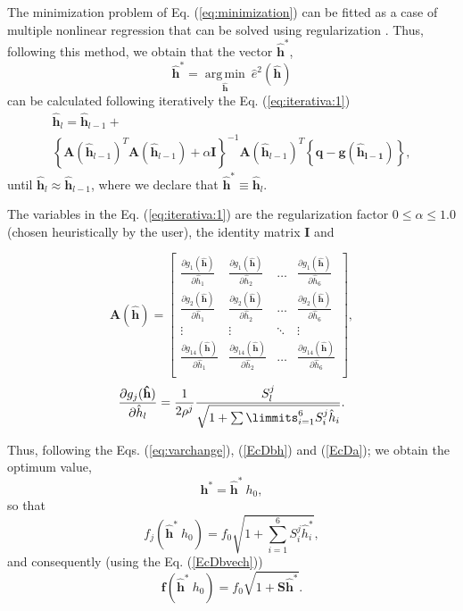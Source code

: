 \documentclass[11pt,twocolumn]{article}
\newcommand{\DERPAR}[4]{\frac{\partial #1_{#3}(\mathbf{\hat{#2}})}{ \partial \hat{#2}_{#4}}}
\begin{document}
The minimization problem of Eq. (\ref{eq:minimization}) can be fitted as a case of multiple nonlinear regression 
that can be solved using regularization 
\citep[pp. 129]{pujaicoriverafernando2020}. 
Thus, following this method, we obtain that the vector $\mathbf{\hat{h}}^{*}$, 
\begin{equation}
\mathbf{\hat{h}}^{*}= \underset{\mathbf{\hat{h}}}{\operatorname {arg\,min}}~\hat{e}^2(\mathbf{\hat{h}})
\end{equation}
can be calculated following iteratively the Eq. (\ref{eq:iterativa:1}) 
\small
\begin{equation}\label{eq:iterativa:1}
\begin{array}{l}
\mathbf{\hat{h}}_{l} = \mathbf{\hat{h}}_{l-1}+\\ 
\left\{\mathbf{A}(\mathbf{\hat{h}}_{l-1})^{T} \mathbf{A}(\mathbf{\hat{h}}_{l-1})+\alpha \mathbf{I}\right\}^{-1}
\mathbf{A}(\mathbf{\hat{h}}_{l-1})^{T} \left\{\mathbf{q}-\mathbf{g}(\mathbf{\hat{h}_{l-1}})\right\},
\end{array}
\end{equation}
\normalsize
until $\mathbf{\hat{h}}_{l} \approx \mathbf{\hat{h}}_{l-1}$,
where we declare that $\mathbf{\hat{h}}^{*} \equiv \mathbf{\hat{h}}_{l}$. 

The variables in the Eq. (\ref{eq:iterativa:1}) are the regularization factor $0 \leq \alpha \leq 1.0$ 
(chosen heuristically  by the user), the identity matrix $\mathbf{I}$ and

\begin{equation}
\mathbf{A}(\mathbf{\hat{h}})=
\left[
\begin{matrix}
\DERPAR{g}{h}{1}{1} & \DERPAR{g}{h}{1}{2} & \hdots & \DERPAR{g}{h}{1}{6} \\ 
\DERPAR{g}{h}{2}{1} & \DERPAR{g}{h}{2}{2} & \hdots & \DERPAR{g}{h}{2}{6} \\
\vdots & \vdots & \ddots & \vdots \\ 
\DERPAR{g}{h}{14}{1} & \DERPAR{g}{h}{14}{2} & \hdots & \DERPAR{g}{h}{14}{6} \\
\end{matrix}
\right],
\end{equation}
\begin{equation}
\DERPAR{g}{h}{j}{l}=
\frac{1}{2 \rho^j}\frac{S_{l}^{j}}{\sqrt{1+\sum\limmits_{i=1}^{6} S_{i}^{j} \hat{h}_i}}.
\end{equation}

Thus, following the Eqs. (\ref{eq:varchange}), (\ref{EcDbh}) and (\ref{EcDa}); we obtain the optimum value,
\begin{equation} \label{eq:optimalh}
\mathbf{h}^* = \mathbf{\hat{h}^*}~h_0,
\end{equation}
so that
\begin{equation} \label{EcDbhath}
f_j(\mathbf{\hat{h}^*}~h_0) = f_0 \sqrt{1 +\sum_{i=1}^{6}{S^{j}_{i} \hat{h}^*_i}},
\end{equation}
and consequently (using the Eq. (\ref{EcDbvech}))
\begin{equation} \label{EcDbhathvec}
\mathbf{f}(\mathbf{\hat{h}^*}~h_0)= f_0 \sqrt{1 +\mathbf{S} \mathbf{\hat{h}^*}}.
\end{equation}
\end{document}
